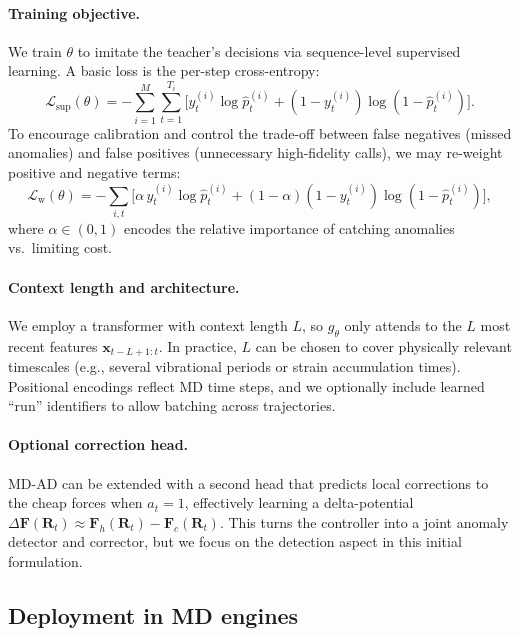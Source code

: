 \documentclass{article}
\begin{document}
\paragraph{Training objective.}
We train $\theta$ to imitate the teacher's decisions via sequence-level supervised learning. A basic loss is the per-step cross-entropy:
\begin{equation}
    \mathcal{L}_\text{sup}(\theta) = - \sum_{i=1}^M \sum_{t=1}^{T_i} \Big[ y_t^{(i)} \log \hat{p}_t^{(i)} + (1 - y_t^{(i)}) \log(1 - \hat{p}_t^{(i)}) \Big].
\end{equation}
To encourage calibration and control the trade-off between false negatives (missed anomalies) and false positives (unnecessary high-fidelity calls), we may re-weight positive and negative terms:
\begin{equation}
    \mathcal{L}_\text{w}(\theta) = - \sum_{i,t} \Big[ \alpha \, y_t^{(i)} \log \hat{p}_t^{(i)} + (1 - \alpha)(1 - y_t^{(i)}) \log(1 - \hat{p}_t^{(i)}) \Big],
\end{equation}
where $\alpha \in (0,1)$ encodes the relative importance of catching anomalies vs.\ limiting cost.

\paragraph{Context length and architecture.}
We employ a transformer with context length $L$, so $g_\theta$ only attends to the $L$ most recent features $\mathbf{x}_{t-L+1:t}$. In practice, $L$ can be chosen to cover physically relevant timescales (e.g., several vibrational periods or strain accumulation times). Positional encodings reflect MD time steps, and we optionally include learned ``run'' identifiers to allow batching across trajectories.

\paragraph{Optional correction head.}
MD-AD can be extended with a second head that predicts local corrections to the cheap forces when $a_t=1$, effectively learning a delta-potential $\Delta \mathbf{F}(\mathbf{R}_t) \approx \mathbf{F}_h(\mathbf{R}_t) - \mathbf{F}_c(\mathbf{R}_t)$. This turns the controller into a joint anomaly detector and corrector, but we focus on the detection aspect in this initial formulation.

\subsection{Deployment in MD engines}
\end{document}
